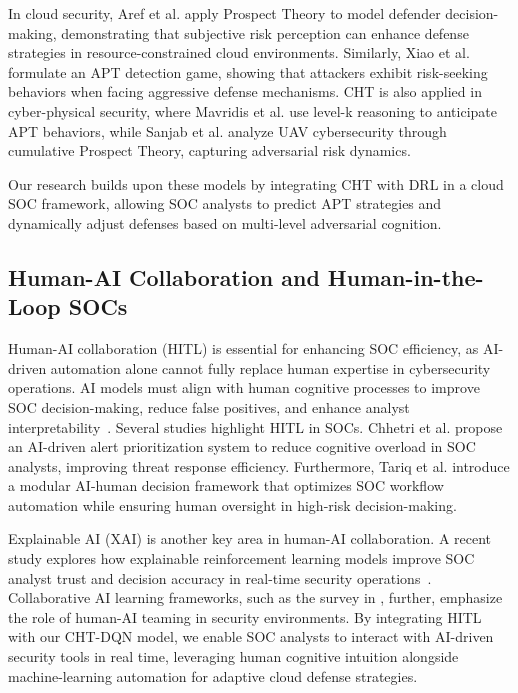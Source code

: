 In cloud security, Aref et al.\cite{aref2022impact} apply Prospect Theory to model defender decision-making, demonstrating that subjective risk perception can enhance defense strategies in resource-constrained cloud environments. Similarly, Xiao et al.\cite{xiao2018attacker} formulate an APT detection game, showing that attackers exhibit risk-seeking behaviors when facing aggressive defense mechanisms.
CHT is also applied in cyber-physical security, where Mavridis et al.\cite{mavridis2023attack} use level-k reasoning to anticipate APT behaviors, while Sanjab et al.\cite{sanjab2020game} analyze UAV cybersecurity through cumulative Prospect Theory, capturing adversarial risk dynamics.

Our research builds upon these models by integrating CHT with DRL in a cloud SOC framework, allowing SOC analysts to predict APT strategies and dynamically adjust defenses based on multi-level adversarial cognition.

\subsection{Human-AI Collaboration and Human-in-the-Loop SOCs}
Human-AI collaboration (HITL) is essential for enhancing SOC efficiency, as AI-driven automation alone cannot fully replace human expertise in cybersecurity operations. AI models must align with human cognitive processes to improve SOC decision-making, reduce false positives, and enhance analyst interpretability~\cite{tariq2024A2C, chhetri2024humanAI}.
Several studies highlight HITL in SOCs. Chhetri et al.\cite{chhetri2022alert} propose an AI-driven alert prioritization system to reduce cognitive overload in SOC analysts, improving threat response efficiency. Furthermore, Tariq et al.\cite{tariq2024A2C} introduce a modular AI-human decision framework that optimizes SOC workflow automation while ensuring human oversight in high-risk decision-making.

Explainable AI (XAI) is another key area in human-AI collaboration. A recent study explores how explainable reinforcement learning models improve SOC analyst trust and decision accuracy in real-time security operations~\cite{xrl2023userstudy}. Collaborative AI learning frameworks, such as the survey in \cite{collaborative2023survey}, further, emphasize the role of human-AI teaming in security environments.
By integrating HITL with our CHT-DQN model, we enable SOC analysts to interact with AI-driven security tools in real time, leveraging human cognitive intuition alongside machine-learning automation for adaptive cloud defense strategies.
